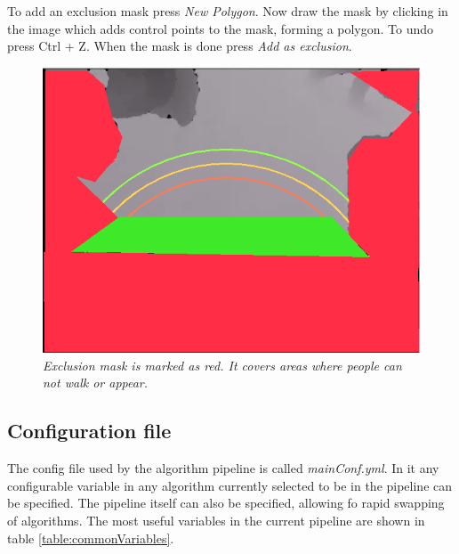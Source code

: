 To add an exclusion mask press \textit{New Polygon}. Now draw the mask by clicking in the image which adds control points to the mask, forming a polygon. To undo press Ctrl + Z. When the mask is done press \textit{Add as exclusion}.

\begin{figure}[H]
	\centering
	\includegraphics[width=\linewidth]{images/Manual1.png}
	\caption[Exclusion mask]{\textit{Exclusion mask is marked as red. It covers areas where people can not walk or appear.}}
	\label{fig:exMask}  %
\end{figure}

\newpage
\subsection{Configuration file}
The config file used by the algorithm pipeline is called \textit{mainConf.yml}. In it any configurable variable in any algorithm currently selected to be in the pipeline can be specified. The pipeline itself can also be specified, allowing fo rapid swapping of algorithms. The most useful variables in the current pipeline are shown in table \ref{table:commonVariables}.\\

